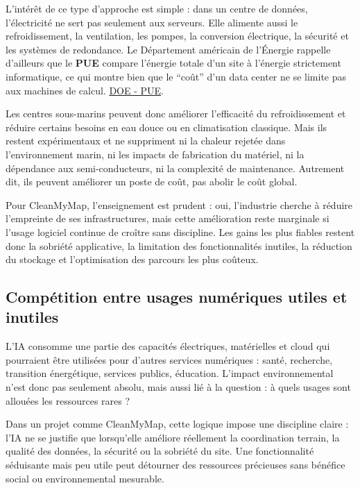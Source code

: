 \documentclass[
  10pt,
  a4paper,
  DIV=11,
  numbers=noendperiod,
  oneside]{scrreprt}
\let\oldtextbf\textbf
\renewcommand{\textbf}[1]{\oldtextbf{\textcolor{cmmnavy}{#1}}}
\begin{document}
L'intérêt de ce type d'approche est simple : dans un centre de données,
l'électricité ne sert pas seulement aux serveurs. Elle alimente aussi le
refroidissement, la ventilation, les pompes, la conversion électrique,
la sécurité et les systèmes de redondance. Le Département américain de
l'Énergie rappelle d'ailleurs que le \textbf{PUE} compare l'énergie
totale d'un site à l'énergie strictement informatique, ce qui montre
bien que le ``coût'' d'un data center ne se limite pas aux machines de
calcul.
\href{https://energy.gov/eere/buildings/data-centers-and-servers}{DOE -
PUE}.

Les centres sous-marins peuvent donc améliorer l'efficacité du
refroidissement et réduire certains besoins en eau douce ou en
climatisation classique. Mais ils restent expérimentaux et ne suppriment
ni la chaleur rejetée dans l'environnement marin, ni les impacts de
fabrication du matériel, ni la dépendance aux semi-conducteurs, ni la
complexité de maintenance. Autrement dit, ils peuvent améliorer un poste
de coût, pas abolir le coût global.

Pour CleanMyMap, l'enseignement est prudent : oui, l'industrie cherche à
réduire l'empreinte de ses infrastructures, mais cette amélioration
reste marginale si l'usage logiciel continue de croître sans discipline.
Les gains les plus fiables restent donc la sobriété applicative, la
limitation des fonctionnalités inutiles, la réduction du stockage et
l'optimisation des parcours les plus coûteux.

\subsection{Compétition entre usages numériques utiles et
inutiles}\label{compuxe9tition-entre-usages-numuxe9riques-utiles-et-inutiles}

L'IA consomme une partie des capacités électriques, matérielles et cloud
qui pourraient être utilisées pour d'autres services numériques : santé,
recherche, transition énergétique, services publics, éducation. L'impact
environnemental n'est donc pas seulement absolu, mais aussi lié à la
question : à quels usages sont allouées les ressources rares ?

Dans un projet comme CleanMyMap, cette logique impose une discipline
claire : l'IA ne se justifie que lorsqu'elle améliore réellement la
coordination terrain, la qualité des données, la sécurité ou la sobriété
du site. Une fonctionnalité séduisante mais peu utile peut détourner des
ressources précieuses sans bénéfice social ou environnemental mesurable.
\end{document}

